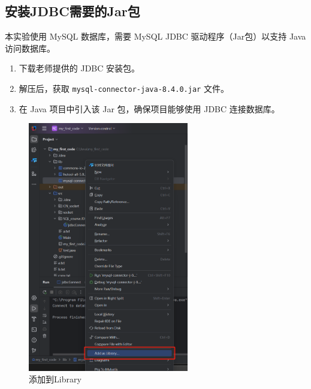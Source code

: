\documentclass{article}
\begin{document}
	\subsection{安装JDBC需要的Jar包}
	
	本实验使用 MySQL 数据库，需要 MySQL JDBC 驱动程序（Jar包）以支持 Java 访问数据库。
	
	\begin{enumerate}
		\item 下载老师提供的 JDBC 安装包。
		\item 解压后，获取 \texttt{mysql-connector-java-8.4.0.jar} 文件。
		\item 在 Java 项目中引入该 Jar 包，确保项目能够使用 JDBC 连接数据库。
	\end{enumerate}
	
	\begin{figure}[H]
		\centering
		\includegraphics[width=7cm]{./images/3.添加到Library.png}
		\caption{添加到Library}
	\end{figure}
	
\end{document}
